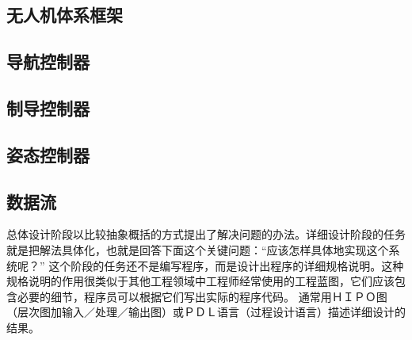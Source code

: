 \subsection{无人机体系框架}
    
\subsection{导航控制器}
    
\subsection{制导控制器}
    
\subsection{姿态控制器}
    
\subsection{数据流}
总体设计阶段以比较抽象概括的方式提出了解决问题的办法。详细设计阶段的任务就是把解法具体化，也就是回答下面这个关键问题：“应该怎样具体地实现这个系统呢？”
这个阶段的任务还不是编写程序，而是设计出程序的详细规格说明。这种规格说明的作用很类似于其他工程领域中工程师经常使用的工程蓝图，它们应该包含必要的细节，程序员可以根据它们写出实际的程序代码。
通常用ＨＩＰＯ图（层次图加输入／处理／输出图）或ＰＤＬ语言（过程设计语言）描述详细设计的结果。
